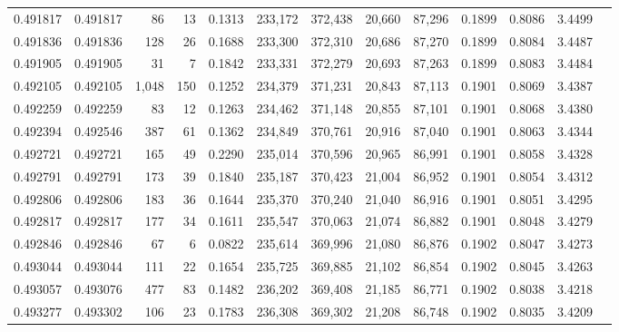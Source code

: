 \begin{tabular}{rrrrrrrrrrrrr}
0.491817 & 0.491817 &    86 &    13 &                                     0.1313 & 233,172 & 372,438 &  20,660 &  87,296 & 0.1899 & 0.8086 & 3.4499 \\
0.491836 & 0.491836 &   128 &    26 &                                     0.1688 & 233,300 & 372,310 &  20,686 &  87,270 & 0.1899 & 0.8084 & 3.4487 \\
0.491905 & 0.491905 &    31 &     7 &                                     0.1842 & 233,331 & 372,279 &  20,693 &  87,263 & 0.1899 & 0.8083 & 3.4484 \\
0.492105 & 0.492105 & 1,048 &   150 &                                     0.1252 & 234,379 & 371,231 &  20,843 &  87,113 & 0.1901 & 0.8069 & 3.4387 \\
0.492259 & 0.492259 &    83 &    12 &                                     0.1263 & 234,462 & 371,148 &  20,855 &  87,101 & 0.1901 & 0.8068 & 3.4380 \\
0.492394 & 0.492546 &   387 &    61 &                                     0.1362 & 234,849 & 370,761 &  20,916 &  87,040 & 0.1901 & 0.8063 & 3.4344 \\
0.492721 & 0.492721 &   165 &    49 &                                     0.2290 & 235,014 & 370,596 &  20,965 &  86,991 & 0.1901 & 0.8058 & 3.4328 \\
0.492791 & 0.492791 &   173 &    39 &                                     0.1840 & 235,187 & 370,423 &  21,004 &  86,952 & 0.1901 & 0.8054 & 3.4312 \\
0.492806 & 0.492806 &   183 &    36 &                                     0.1644 & 235,370 & 370,240 &  21,040 &  86,916 & 0.1901 & 0.8051 & 3.4295 \\
0.492817 & 0.492817 &   177 &    34 &                                     0.1611 & 235,547 & 370,063 &  21,074 &  86,882 & 0.1901 & 0.8048 & 3.4279 \\
0.492846 & 0.492846 &    67 &     6 &                                     0.0822 & 235,614 & 369,996 &  21,080 &  86,876 & 0.1902 & 0.8047 & 3.4273 \\
0.493044 & 0.493044 &   111 &    22 &                                     0.1654 & 235,725 & 369,885 &  21,102 &  86,854 & 0.1902 & 0.8045 & 3.4263 \\
0.493057 & 0.493076 &   477 &    83 &                                     0.1482 & 236,202 & 369,408 &  21,185 &  86,771 & 0.1902 & 0.8038 & 3.4218 \\
0.493277 & 0.493302 &   106 &    23 &                                     0.1783 & 236,308 & 369,302 &  21,208 &  86,748 & 0.1902 & 0.8035 & 3.4209 \\

\end{tabular}
